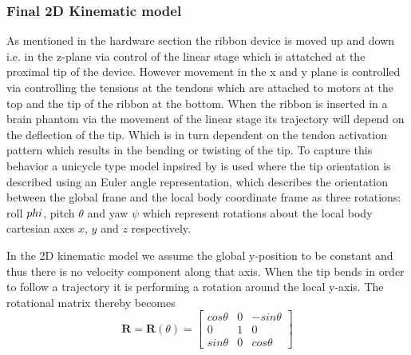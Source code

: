 \subsubsection{Final 2D Kinematic model}
As mentioned in the hardware section the ribbon device is moved up and down i.e. in the z-plane via control of the linear stage which is attatched at the proximal tip of the device. However movement in the x and y plane is controlled via controlling the tensions at the tendons which are attached to motors at the top and the tip of the ribbon at the bottom. When the ribbon is inserted in a brain phantom via the movement of the linear stage its trajectory will depend on the deflection of the tip. Which is in turn dependent on the tendon activation pattern which results in the bending or twisting of the tip. 
\newline \newline
To capture this behavior a unicycle type model inpsired by \cite{ko_two-dimensional_2010} is used where the tip orientation is described using an Euler angle representation, which describes the orientation between the global frane and the local body coordinate frame as three rotations: roll \(\\phi\), pitch \(\theta\) and yaw \(\psi\) which represent rotations about the local body cartesian axes \(x\), \(y\) and \(z\) respectively.


In the 2D kinematic model we assume the global y-position to be constant and thus there is no velocity component along that axis. When the tip bends in order to follow a trajectory it is performing a rotation around the local y-axis. The rotational matrix thereby becomes
\begin{equation}
    \textbf{R} = \textbf{R}(\theta) = \begin{bmatrix}
        cos \theta   &   0   &   -sin \theta \\
        0            &   1   &   0\\
        sin \theta   &   0   &   cos \theta
    \end{bmatrix}
\end{equation}

